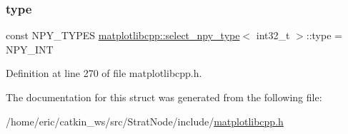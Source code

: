 \subsubsection{\texorpdfstring{type}{type}}
{\footnotesize\ttfamily const N\+P\+Y\+\_\+\+T\+Y\+P\+ES \mbox{\hyperlink{structmatplotlibcpp_1_1select__npy__type}{matplotlibcpp\+::select\+\_\+npy\+\_\+type}}$<$ int32\+\_\+t $>$\+::type = N\+P\+Y\+\_\+\+I\+NT\hspace{0.3cm}{\ttfamily [static]}}



Definition at line 270 of file matplotlibcpp.\+h.



The documentation for this struct was generated from the following file\+:\begin{DoxyCompactItemize}
\item 
/home/eric/catkin\+\_\+ws/src/\+Strat\+Node/include/\mbox{\hyperlink{matplotlibcpp_8h}{matplotlibcpp.\+h}}\end{DoxyCompactItemize}

